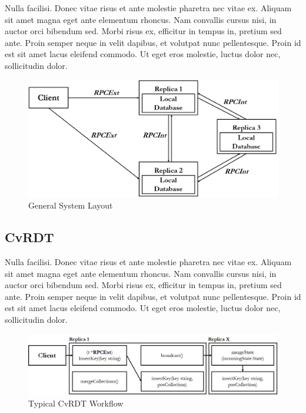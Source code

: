 \documentclass[sigconf,nonacm,11pt]{acmart}
\begin{document}
Nulla facilisi. Donec vitae risus et ante molestie pharetra nec vitae ex. Aliquam sit amet magna eget ante elementum rhoncus. Nam convallis cursus nisi, in auctor orci bibendum sed. Morbi risus ex, efficitur in tempus in, pretium sed ante. Proin semper neque in velit dapibus, et volutpat nunc pellentesque. Proin id est sit amet lacus eleifend commodo. Ut eget eros molestie, luctus dolor nec, sollicitudin dolor.

\begin{figure}[h]
  \centering
  \includegraphics[width=\linewidth]{Fig1Sys}
  \caption{General System Layout}
  \label{fig:sys}
\end{figure}

\subsection{CvRDT}

Nulla facilisi. Donec vitae risus et ante molestie pharetra nec vitae ex. Aliquam sit amet magna eget ante elementum rhoncus. Nam convallis cursus nisi, in auctor orci bibendum sed. Morbi risus ex, efficitur in tempus in, pretium sed ante. Proin semper neque in velit dapibus, et volutpat nunc pellentesque. Proin id est sit amet lacus eleifend commodo. Ut eget eros molestie, luctus dolor nec, sollicitudin dolor.

\begin{figure}[h]
  \centering
  \includegraphics[width=15cm]{Fig2CvRDT1}
  \caption{Typical CvRDT Workflow}
  \label{fig:cvrdt1}
\end{figure}
\end{document}
